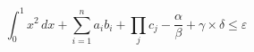 \begin{equation}
  \int_0^1 x^2 \, dx + \sum_{i=1}^{n} a_i b_i + \prod_{j} c_j - \frac{\alpha}{\beta} + \gamma
  \times \delta \leq \varepsilon
\end{equation}
